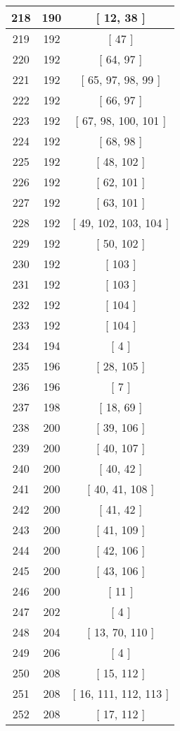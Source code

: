 \begin{center}
\begin{longtable}[H]{|| c c c ||}
\hline
218 & 190 & [ 12, 38 ] \\ 
\hline
219 & 192 & [ 47 ] \\ 
\hline
220 & 192 & [ 64, 97 ] \\ 
\hline
221 & 192 & [ 65, 97, 98, 99 ] \\ 
\hline
222 & 192 & [ 66, 97 ] \\ 
\hline
223 & 192 & [ 67, 98, 100, 101 ] \\ 
\hline
224 & 192 & [ 68, 98 ] \\ 
\hline
225 & 192 & [ 48, 102 ] \\ 
\hline
226 & 192 & [ 62, 101 ] \\ 
\hline
227 & 192 & [ 63, 101 ] \\ 
\hline
228 & 192 & [ 49, 102, 103, 104 ] \\ 
\hline
229 & 192 & [ 50, 102 ] \\ 
\hline
230 & 192 & [ 103 ] \\ 
\hline
231 & 192 & [ 103 ] \\ 
\hline
232 & 192 & [ 104 ] \\ 
\hline
233 & 192 & [ 104 ] \\ 
\hline
234 & 194 & [ 4 ] \\ 
\hline
235 & 196 & [ 28, 105 ] \\ 
\hline
236 & 196 & [ 7 ] \\ 
\hline
237 & 198 & [ 18, 69 ] \\ 
\hline
238 & 200 & [ 39, 106 ] \\ 
\hline
239 & 200 & [ 40, 107 ] \\ 
\hline
240 & 200 & [ 40, 42 ] \\ 
\hline
241 & 200 & [ 40, 41, 108 ] \\ 
\hline
242 & 200 & [ 41, 42 ] \\ 
\hline
243 & 200 & [ 41, 109 ] \\ 
\hline
244 & 200 & [ 42, 106 ] \\ 
\hline
245 & 200 & [ 43, 106 ] \\ 
\hline
246 & 200 & [ 11 ] \\ 
\hline
247 & 202 & [ 4 ] \\ 
\hline
248 & 204 & [ 13, 70, 110 ] \\ 
\hline
249 & 206 & [ 4 ] \\ 
\hline
250 & 208 & [ 15, 112 ] \\ 
\hline
251 & 208 & [ 16, 111, 112, 113 ] \\ 
\hline
252 & 208 & [ 17, 112 ] \\ 

\end{longtable}
\end{center}
